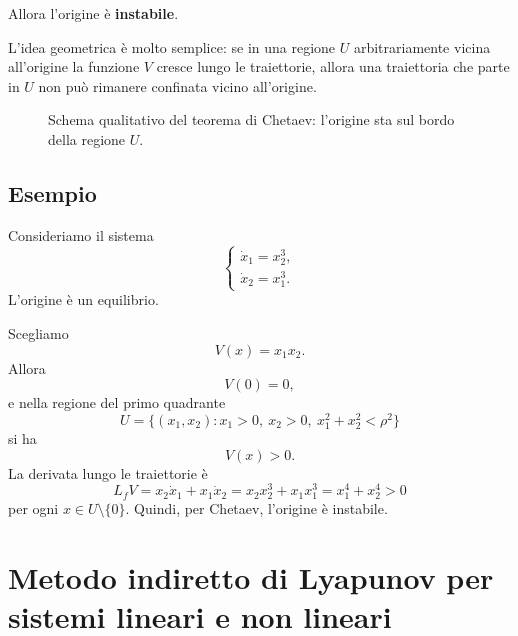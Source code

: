 Allora l'origine \`e \textbf{instabile}.

\medskip

\noindent
L'idea geometrica \`e molto semplice: se in una regione \(U\) arbitrariamente vicina all'origine la funzione \(V\) cresce lungo le traiettorie, allora una traiettoria che parte in \(U\) non pu\`o rimanere confinata vicino all'origine.

\begin{figure}[h!]
\centering
{}
\caption{Schema qualitativo del teorema di Chetaev: l'origine sta sul bordo della regione \(U\).}
\end{figure}

\subsection{Esempio}

Consideriamo il sistema
\[
\begin{cases}
\dot x_1 = x_2^3,\\[4pt]
\dot x_2 = x_1^3.
\end{cases}
\]
L'origine \`e un equilibrio.

Scegliamo
\[
V(x)=x_1x_2.
\]
Allora
\[
V(0)=0,
\]
e nella regione del primo quadrante
\[
U=\{(x_1,x_2):x_1>0,\ x_2>0,\ x_1^2+x_2^2<\rho^2\}
\]
si ha
\[
V(x)>0.
\]
La derivata lungo le traiettorie \`e
\[
L_fV = x_2 \dot x_1 + x_1 \dot x_2 = x_2 x_2^3 + x_1 x_1^3 = x_1^4 + x_2^4 > 0
\]
per ogni \(x\in U\setminus\{0\}\). Quindi, per Chetaev, l'origine \`e instabile.

\section{Metodo indiretto di Lyapunov per sistemi lineari e non lineari}

